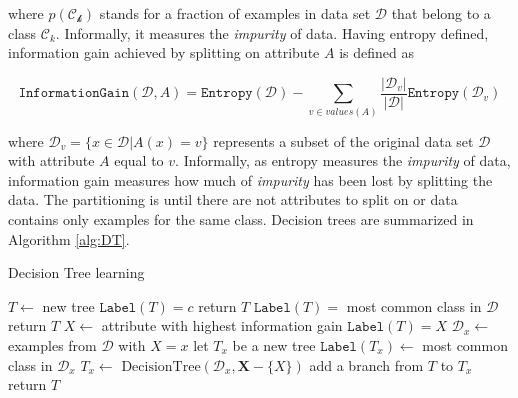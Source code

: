 where $p(\mathcal{C_k})$ stands for a fraction of examples in data set $\mathcal{D}$ that belong to a class $\mathcal{C}_k$. Informally, it measures the \textit{impurity} of data. Having entropy defined, information gain achieved by splitting on attribute $A$ is defined as

\begin{equation}
	\mathtt{InformationGain}(\mathcal{D}, A) = \mathtt{Entropy}(\mathcal{D}) - \sum_{v \in values(A)} \frac{\vert \mathcal{D}_v \vert}{\vert \mathcal{D} \vert}\mathtt{Entropy}(\mathcal{D}_v)
\end{equation} 

where $\mathcal{D}_v = \{ x \in \mathcal{D} | A(x) = v \}$ represents a subset of the original data set $\mathcal{D}$ with attribute $A$ equal to $v$. Informally, as entropy measures the \textit{impurity} of data, information gain measures how much of \textit{impurity} has been lost by splitting the data. The partitioning is until there are not attributes to split on or data contains only examples for the same class. Decision trees are summarized in Algorithm \ref{alg:DT}.


\begin{algorithm}
	\caption{Decision Tree learning}
	\label{alg:DT}
	\begin{algorithmic}[1]
			\State $T \gets$ new tree
				\State $\mathtt{Label}(T) = c$
				\State return $T$
			\EndIf	
				\State $\mathtt{Label}(T) = $ most common class in $\mathcal{D}$
				\State return $T$
			\EndIf 
			\State $X \gets$ attribute with highest information gain
			\State $\mathtt{Label}(T) = X$
				\State $\mathcal{D}_x \gets $ examples from $\mathcal{D}$ with $X = x$
					\State let $T_x$ be a new tree
					\State $\mathtt{Label}(T_x) \gets $ most common class in $\mathcal{D}_x$
				\Else
					\State $T_x \gets \text{ DecisionTree}(\mathcal{D}_x, \mathbf{X} - \{ X \})$
				\EndIf
				\State add a branch from $T$ to $T_x$
			\EndFor
			\State return $T$
		\EndFunction 
	\end{algorithmic}
\end{algorithm}


